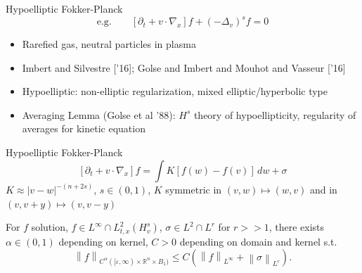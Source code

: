 \documentclass{beamer}
\newcommand{\R}{\mathbb{R}}
\newcommand{\eps}{\varepsilon}
\newcommand{\norm}[1]{\left\lVert#1\right\rVert}
\newcommand{\paren}[1]{\left( #1 \right)}
\newcommand{\bracket}[1]{\left[ #1 \right]}
\newcommand{\del}{\partial}
\newcommand{\grad}{\nabla}
\newcommand{\Laplace}{\Delta}
\begin{document}
\begin{frame}{Hypoelliptic Fokker-Planck}
\pause
\[\textrm{e.g.} \qquad \bracket{\del_t + v\cdot\grad_x} f + \paren{-\Laplace_v}^s f = 0 \]

\begin{itemize}
\item Rarefied gas, neutral particles in plasma
\item Imbert and Silvestre ['16]; Golse and Imbert and Mouhot and Vasseur ['16]
\item Hypoelliptic: non-elliptic regularization, mixed elliptic/hyperbolic type
\item Averaging Lemma (Golse et al '88): $H^s$ theory of hypoellipticity, regularity of averages for kinetic equation
\end{itemize}
\end{frame}


\begin{frame}{Hypoelliptic Fokker-Planck}
\[ \bracket{\del_t + v\cdot\grad_x} f = \int K [f(w)-f(v)] \,dw + \sigma \]
$K \approx |v-w|^{-(n+2s)}$, $s \in (0,1)$, $K$ symmetric in $(v,w)\mapsto(w,v)$ and in $(v,v+y)\mapsto(v,v-y)$

\begin{theorem}[S. [SIMA, '19{]}]
For $f$ solution, $f \in L^\infty \cap L^2_{t,x}(H^s_v)$, $\sigma \in L^2 \cap L^r$ for $r >> 1$, 
there exists $\alpha \in (0,1)$ depending on kernel, $C > 0$ depending on domain and kernel s.t.
\[ \norm{f}_{C^\alpha([\eps,\infty)\times\R^n\times B_1)} \leq C \paren{\norm{f}_{L^\infty} + \norm{\sigma}_{L^r}}. \]
\end{theorem}

\end{frame}


%

\end{document}
